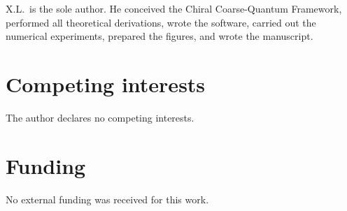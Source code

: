 \documentclass[twocolumn,11pt,a4paper]{article}
\begin{document}
X.L.\ is the sole author. He conceived the Chiral Coarse-Quantum Framework, performed all theoretical derivations, wrote the software, carried out the numerical experiments, prepared the figures, and wrote the manuscript.

\section*{Competing interests}

The author declares no competing interests.

\section*{Funding}

No external funding was received for this work.
\end{document}
